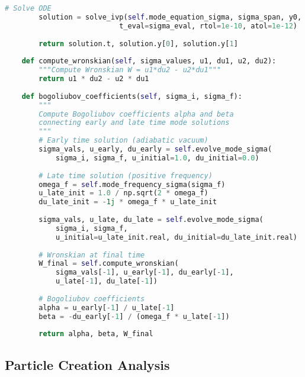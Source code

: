 \documentclass[11pt,a4paper]{article}
\begin{document}
\begin{lstlisting}[language=Python, caption=QFT Mode Evolution in Log-Time]
        # Solve ODE
        solution = solve_ivp(self.mode_equation_sigma, sigma_span, y0, 
                           t_eval=sigma_eval, rtol=1e-10, atol=1e-12)
        
        return solution.t, solution.y[0], solution.y[1]
    
    def compute_wronskian(self, sigma_values, u1, du1, u2, du2):
        """Compute Wronskian W = u1*du2 - u2*du1"""
        return u1 * du2 - u2 * du1
    
    def bogoliubov_coefficients(self, sigma_i, sigma_f):
        """
        Compute Bogoliubov coefficients alpha and beta
        connecting early and late time mode solutions
        """
        # Early time solution (adiabatic vacuum)
        sigma_vals, u_early, du_early = self.evolve_mode_sigma(
            sigma_i, sigma_f, u_initial=1.0, du_initial=0.0)
        
        # Late time solution (positive frequency)
        omega_f = self.mode_frequency_sigma(sigma_f)
        u_late_init = 1.0 / np.sqrt(2 * omega_f)
        du_late_init = -1j * omega_f * u_late_init
        
        sigma_vals, u_late, du_late = self.evolve_mode_sigma(
            sigma_i, sigma_f, 
            u_initial=u_late_init.real, du_initial=du_late_init.real)
        
        # Wronskian at final time
        W_final = self.compute_wronskian(
            sigma_vals[-1], u_early[-1], du_early[-1], 
            u_late[-1], du_late[-1])
        
        # Bogoliubov coefficients
        alpha = u_early[-1] / u_late[-1]
        beta = -du_early[-1] / (omega_f * u_late[-1])
        
        return alpha, beta, W_final
\end{lstlisting}

\subsection{Particle Creation Analysis}
\end{document}
